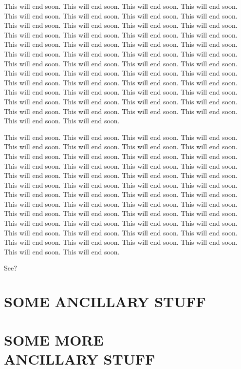 \documentclass[12pt,econ]{authesis}
\def\ssp{\def\baselinestretch{1.0}\large\normalsize}
\begin{document}
This will end soon. This will end soon. This will end soon. This will end soon. This will end soon. This will end soon. This will end soon. This will end soon. This will end soon. This will end soon. This will end soon. This will end soon. This will end soon. This will end soon. This will end soon. This will end soon. This will end soon. This will end soon. This will end soon. This will end soon. This will end soon. This will end soon. This will end soon. This will end soon. This will end soon. This will end soon. This will end soon. This will end soon. This will end soon. This will end soon. This will end soon. This will end soon. This will end soon. This will end soon. This will end soon. This will end soon. This will end soon. This will end soon. This will end soon. This will end soon. This will end soon. This will end soon. This will end soon. This will end soon. This will end soon. This will end soon. This will end soon. This will end soon. This will end soon. This will end soon. 

This will end soon. This will end soon. This will end soon. This will end soon. This will end soon. This will end soon. This will end soon. This will end soon. This will end soon. This will end soon. This will end soon. This will end soon. This will end soon. This will end soon. This will end soon. This will end soon. This will end soon. This will end soon. This will end soon. This will end soon. This will end soon. This will end soon. This will end soon. This will end soon. This will end soon. This will end soon. This will end soon. This will end soon. This will end soon. This will end soon. This will end soon. This will end soon. This will end soon. This will end soon. This will end soon. This will end soon. This will end soon. This will end soon. This will end soon. This will end soon. This will end soon. This will end soon. This will end soon. This will end soon. This will end soon. This will end soon. This will end soon. This will end soon. This will end soon. This will end soon. 

See?

\appendix

\chapter{SOME ANCILLARY STUFF}


\chapter{SOME MORE\\ANCILLARY STUFF}



\ssp                           %
\nocite{*}
\end{document}

